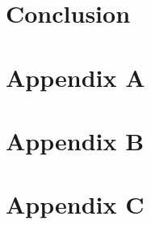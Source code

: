 \documentclass[12pt,a4paper]{report}
\begin{document}
\chapter{Conclusion}
\label{chap:conc}






\chapter{Appendix A}
\label{chap:app}


\chapter{Appendix B}
\label{chap:app_b}


\chapter{Appendix C}
\label{chap:app_b}

\end{document}
